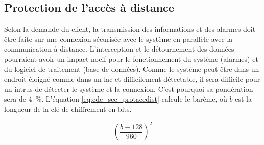 

\subsection{Protection de l’accès à distance}
\label{s:cdc_sec_protaccdist}

Selon la demande du client, la transmission des informations et des alarmes doit être faite sur une connexion sécurisée avec le système en parallèle avec la communication à distance.
L’interception et le détournement des données pourraient avoir un impact nocif pour le fonctionnement du système (alarmes) et du logiciel de traitement (base de données).
Comme le système peut être dans un endroit éloigné comme dans un lac et difficilement détectable, il sera difficile pour un intrus de détecter le système et la connexion.
C’est pourquoi sa pondération sera de 4~\%.
L'équation \ref{eq:cdc_sec_protaccdist} calcule le barème, où $b$ est la longueur de la clé de chiffrement en bits.

\begin{equation}\label{eq:cdc_sec_protaccdist}
	\left(\frac{b-128}{960}\right)^2
\end{equation}